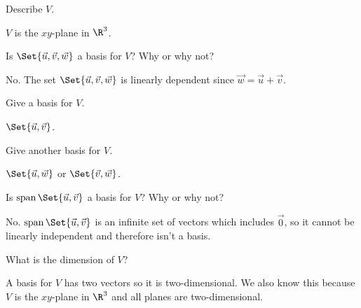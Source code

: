 	\begin{parts}
		\item Describe $V$.
			\begin{solution}[inline]
				$V$ is the $xy$-plane in $\R^3$.
			\end{solution}
		\item Is $\Set{\vec u,\vec v,\vec w}$ a basis for $V$?  Why or why not?
			\begin{solution}
				No. The set $\Set{\vec u,\vec v,\vec w}$ is linearly dependent since $\vec w=\vec u+\vec v$.
			\end{solution}
		\item Give a basis for $V$.
			\begin{solution}[inline]
				$\Set{\vec u,\vec v}$.
			\end{solution}
		\item Give another basis for $V$.
			\begin{solution}[inline]
				$\Set{\vec u,\vec w}$ or $\Set{\vec v,\vec w}$.
			\end{solution}
		\item Is $\Span\Set{\vec u,\vec v}$ a basis for $V$?  Why or why not?
			\begin{solution}
				No. $\Span\Set{\vec u,\vec v}$ is an infinite set of vectors
				which includes $\vec 0$, so it cannot be linearly independent and
				therefore isn't a basis.
			\end{solution}
		\item What is the dimension of $V$?
			\begin{solution}
				A basis for $V$ has two vectors so it is two-dimensional. We also
				know this because $V$ is the $xy$-plane in $\R^3$ and all planes
				are two-dimensional.
			\end{solution}
	\end{parts}

